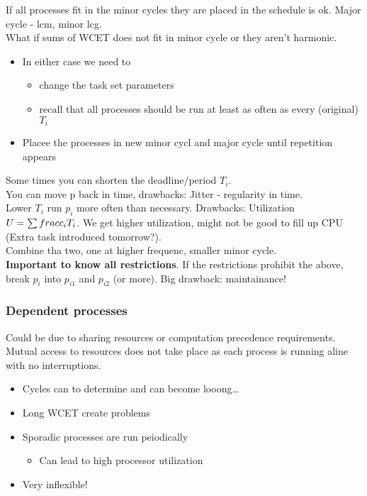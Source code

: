 \documentclass[course, english]{Notes}
\begin{document}
If all processes fit in the minor cycles they are placed in the schedule is ok.
Major cycle - lcm, minor lcg.\\
What if sums of WCET does not fit in minor cycle or they aren't harmonic.
\begin{itemize}
	\item In either case we need to
		\begin{itemize}
			\item change the task set parameters
			\item recall that all processes should be run at least
				as often as every (original) $T_i$
		\end{itemize}
	\item Placee the processes in new minor cycl and major cycle until
		repetition appears
\end{itemize}
Some times you can shorten the deadline/period $T_i$. 
\\ You can move p back in time, drawbacks: Jitter - regularity in time.\\
Lower $T_i$ run $p_i$ more often than necessary. Drawbacks: Utilization
$U = \sum\\frac{c_i}{T_i}$. We get higher utilization, might not be good to fill
up CPU (Extra task introduced tomorrow?).\\
Combine tha two, one at higher frequenc, smaller minor cycle.\\
\textbf{Important to know all restrictions}. If the restrictions prohibit the
above, break $p_i$ into $p_{i1}$ and $p_{i2}$ (or more). Big drawback:
maintainance!

\subsubsection{Dependent processes}
Could be due to sharing resources or computation precedence requirements. Mutual
access to resources does not take place as each process is running aline with no
interruptions.
\begin{itemize}
	\item Cycles can to determine and can become looong\ldots
	\item Long WCET create problems
	\item Sporadic processes are run peiodically
		\begin{itemize}
			\item Can lead to high processor utilization
		\end{itemize}
	\item Very inflexible!
\end{itemize}
\end{document}
